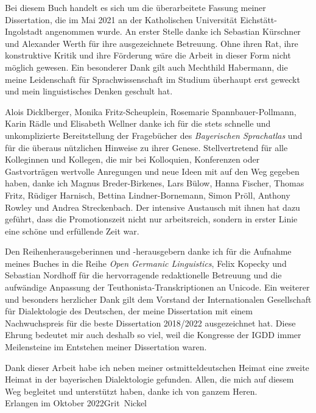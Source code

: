 \addchap{\lsPrefaceTitle}
Bei diesem Buch handelt es sich um die überarbeitete Fassung meiner Dissertation, die im Mai 2021 an der Katholischen Universität Eichstätt-Ingolstadt angenommen wurde. An erster Stelle danke ich Sebastian Kürschner und Alexander Werth für ihre ausgezeichnete Betreuung. Ohne ihren Rat, ihre konstruktive Kritik und ihre Förderung wäre die Arbeit in dieser Form nicht möglich gewesen. Ein besonderer Dank gilt auch Mechthild Habermann, die meine Leidenschaft für Sprachwissenschaft im Studium überhaupt erst geweckt und mein linguistisches Denken geschult hat.


Alois Dicklberger, Monika Fritz-Scheuplein, Rosemarie Spannbauer-Pollmann, Karin Rädle und Elisabeth Wellner danke ich für die stets schnelle und unkomplizierte Bereitstellung der Fragebücher des \textit{Bayerischen Sprachatlas} und für die überaus nützlichen Hinweise zu ihrer Genese. Stellvertretend für alle Kolleginnen und Kollegen, die mir bei Kolloquien, Konferenzen oder Gastvorträgen wertvolle Anregungen und neue Ideen mit auf den Weg gegeben haben, danke ich Magnus Breder-Birkenes, Lars Bülow, Hanna Fischer, Thomas Fritz, Rüdiger Harnisch, Bettina Lindner-Bornemann, Simon Pröll, Anthony Rowley und Andrea Streckenbach. Der intensive Austausch mit ihnen hat dazu geführt, dass die Promotionszeit nicht nur arbeitsreich, sondern in erster Linie eine schöne und erfüllende Zeit war.


Den Reihenherausgeberinnen und -herausgebern danke ich für die Aufnahme meines Buches in die Reihe \textit{Open Germanic Linguistics}, Felix Kopecky und Se\-bas\-ti\-an Nordhoff für die hervorragende redaktionelle Betreuung und die aufwändige Anpassung der Teuthonista-Transkriptionen an Unicode. Ein weiterer und besonders herzlicher Dank gilt dem Vorstand der Internationalen Gesellschaft für Dialektologie des Deutschen, der meine Dissertation mit einem Nachwuchspreis für die beste Dissertation 2018/2022 ausgezeichnet hat. Diese Ehrung bedeutet mir auch deshalb so viel, weil die Kongresse der IGDD immer  Meilensteine im Entstehen meiner Dissertation waren.


Dank dieser Arbeit habe ich neben meiner ostmitteldeutschen Heimat eine zweite Heimat in der bayerischen Dialektologie gefunden. Allen, die mich auf diesem Weg begleitet und unterstützt haben, danke ich von ganzem Heren.\bigskip\\
\noindent Erlangen im Oktober 2022\hfill\hbox{Grit Nickel}
